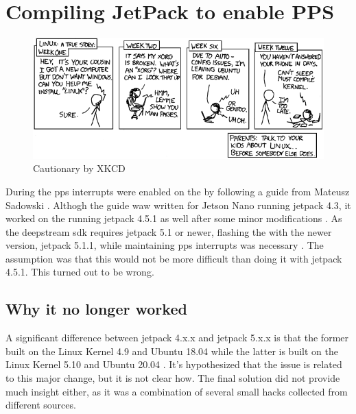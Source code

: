 

\section{Compiling JetPack to enable PPS}
\begin{figure}[H]
    \centering
    \includegraphics[width=\textwidth]{figures/cautionary.png}
    \caption{Cautionary by XKCD \cite{xkcdCautionary}}
\end{figure}
During the \preproject \gls{pps} interrupts were enabled on the \jx by following a guide from Mateusz Sadowski \cite{sadowskiEnablingPPSJetson2020} \cite[26]{martensPortableSensorRig2022}.
Althogh the guide waw written for Jetson Nano running \gls{jetpack} 4.3, it worked on the \jx running \gls{jetpack} 4.5.1 as well after some minor modifications \cite{sadowskiEnablingPPSJetson2020} \cite[26]{martensPortableSensorRig2022}.
As the \gls{deepstream} \gls{sdk} requires \gls{jetpack} 5.1 or newer, flashing the \jx with the newer version, \gls{jetpack} 5.1.1, while maintaining \gls{pps} interrupts was necessary \cite{nvidiaDeepStreamSDKGet2019}.
The assumption was that this would not be more difficult than doing it with \gls{jetpack} 4.5.1.
This turned out to be wrong.

\subsection{Why it no longer worked}
A significant difference between \gls{jetpack} 4.x.x and \gls{jetpack} 5.x.x is that the former built on the Linux Kernel 4.9 and Ubuntu 18.04
while the latter is built on the Linux Kernel 5.10 and Ubuntu 20.04 \cite{nvidiaJetPackSDK2022}\cite{nvidiaJetPackSDK2023}.
It's hypothesized that the issue is related to this major change, but it is not clear how.
The final solution did not provide much insight either, as it was a combination of several small hacks collected from different sources.

